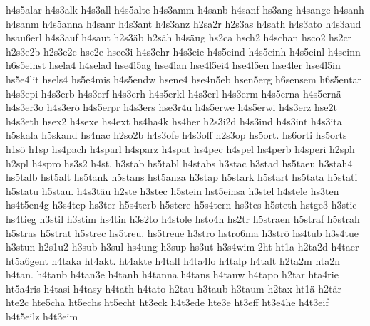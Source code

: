 {    h4s5alar
    h4s3alk
    h4s3all
    h4s5alte
    h4s3amm
    h4sanb
    h4sanf
    hs3ang
    h4sange
    h4sanh
    h4sanm
    h4s5anna
    h4sanr
    h4s3ant
    h4s3anz
    h2sa2r
    h2s3as
    h4sath
    h4s3ato
    h4s3aud
    hsau6erl
    h4s3auf
    h4saut
    h2s3äb
    h2säh
    h4säug
    hs2ca
    hsch2
    h4schan
    hsco2
    hs2cr
    h2s3e2b
    h2s3e2c
    hse2e
    hsee3i
    h4s3ehr
    h4s3eie
    h4s5eind
    h4s5einh
    h4s5einl
    h4seinn
    h6s5einst
    hsela4
    h4selad
    hse4l5ag
    hse4lan
    hse4l5ei4
    hse4l5en
    hse4ler
    hse4l5in
    hs5e4lit
    hsels4
    hs5e4mis
    h4s5endw
    hsene4
    hse4n5eb
    hsen5erg
    h6sensem
    h6s5entar
    h4s3epi
    h4s3erb
    h4s3erf
    h4s3erh
    h4s5erkl
    h4s3erl
    h4s3erm
    h4s5erna
    h4s5ernä
    h4s3er3o
    h4s3erö
    h4s5erpr
    h4s3ers
    hse3r4u
    h4s5erwe
    h4s5erwi
    h4s3erz
    hse2t
    h4s3eth
    hsex2
    h4sexe
    hs4ext
    hs4ha4k
    hs4her
    h2s3i2d
    h4s3ind
    h4s3int
    h4s3ita
    h5skala
    h5skand
    hs4nac
    h2so2b
    h4s3ofe
    h4s3off
    h2s3op
    hs5ort.
    hs6orti
    hs5orts
    h1sö
    h1sp
    hs4pach
    h4sparl
    h4sparz
    h4spat
    hs4pec
    h4spel
    hs4perb
    h4speri
    h2sph
    h2spl
    h4spro
    hs3s2
    h4st.
    h3stab
    hs5tabl
    h4stabs
    h3stac
    h3stad
    hs5taeu
    h3stah4
    hs5talb
    hst5alt
    hs5tank
    h5stans
    hst5anza
    h3stap
    h5stark
    h5start
    hs5tata
    h5stati
    h5statu
    h5stau.
    h4s3täu
    h2ste
    h3stec
    h5stein
    hst5einsa
    h3stel
    h4stele
    hs3ten
    hs4t5en4g
    h3s4tep
    hs3ter
    h5s4terb
    h5stere
    h5s4tern
    hs3tes
    h5steth
    hstge3
    h3stic
    hs4tieg
    h3stil
    h3stim
    hs4tin
    h3s2to
    h4stole
    hsto4n
    hs2tr
    h5straen
    h5straf
    h5strah
    h5stras
    h5strat
    h5strec
    hs5treu.
    hs5treue
    h3stro
    hstro6ma
    h3strö
    hs4tub
    h3s4tue
    h3stun
    h2s1u2
    h3sub
    h3sul
    hs4ung
    h3sup
    hs3ut
    h3s4wim
    2ht
    ht1a
    h2ta2d
    h4taer
    ht5a6gent
    h4taka
    ht4akt.
    ht4akte
    h4tall
    h4ta4lo
    h4talp
    h4talt
    h2ta2m
    hta2n
    h4tan.
    h4tanb
    h4tan3e
    h4tanh
    h4tanna
    h4tans
    h4tanw
    h4tapo
    h2tar
    hta4rie
    ht5a4ris
    h4tasi
    h4tasy
    h4tath
    h4tato
    h2tau
    h3taub
    h3taum
    h2tax
    ht1ä
    h2tär
    hte2c
    hte5cha
    ht5echs
    ht5echt
    ht3eck
    h4t3ede
    hte3e
    ht3eff
    ht3e4he
    h4t3eif
    h4t5eilz
    h4t3eim
}

